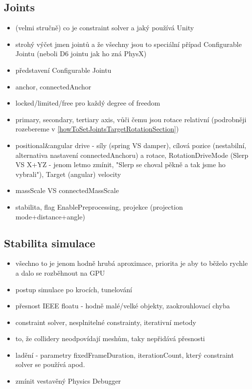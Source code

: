 \subsection{Joints}
\begin{itemize}
    \item (velmi stručně) co je constraint solver a jaký používá Unity
    \item strohý výčet jmen jointů a že všechny jsou to speciální případ Configurable Jointu (neboli D6 jointu jak ho zná PhysX)
    \item představení Configurable Jointu
    \item anchor, connectedAnchor
    \item locked/limited/free pro každý degree of freedom
    \item primary, secondary, tertiary axis, vůči čemu jsou rotace relativní (podrobněji rozebereme v \ref{howToSetJointsTargetRotationSection})
    \item positional\&angular drive - síly (spring VS damper), cílová pozice (nestabilní, alternativa nastavení connectedAnchoru) a rotace, RotationDriveMode (Slerp VS X+YZ - jenom letmo zmínit, "Slerp se choval pěkně a tak jsme ho vybrali"), Target (angular) velocity
    \item massScale VS connectedMassScale
    \item stabilita, flag EnablePreprocessing, projekce (projection mode+distance+angle)
\end{itemize}


\subsection{Stabilita simulace}
\begin{itemize}
    \item všechno to je jenom hodně hrubá aproximace, priorita je aby to běželo rychle a dalo se rozběhnout na GPU
    \item postup simulace po krocích, tunelování
    \item přesnost IEEE floatu - hodně malé/velké objekty, zaokrouhlovací chyba
    \item constraint solver, nesplnitelné constrainty, iterativní metody
    \item to, že collidery neodpovídají meshům, taky nepřidává přesnosti
    \item ladění - parametry fixedFrameDuration, iterationCount, který constraint solver se používá apod.
    \item zmínit vestavěný Physics Debugger
\end{itemize}


